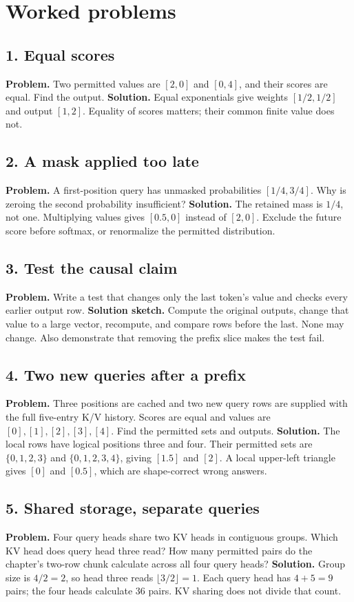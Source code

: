 \section{Worked problems}
\subsection*{1. Equal scores}
\textbf{Problem.} Two permitted values are $[2,0]$ and $[0,4]$, and their
scores are equal. Find the output.
\textbf{Solution.} Equal exponentials give weights $[1/2,1/2]$ and output
$[1,2]$. Equality of scores matters; their common finite value does not.
\subsection*{2. A mask applied too late}
\textbf{Problem.} A first-position query has unmasked probabilities
$[1/4,3/4]$. Why is zeroing the second probability insufficient?
\textbf{Solution.} The retained mass is $1/4$, not one. Multiplying values
gives $[0.5,0]$ instead of $[2,0]$. Exclude the future score before softmax,
or renormalize the permitted distribution.
\subsection*{3. Test the causal claim}
\textbf{Problem.} Write a test that changes only the last token's value
and checks every earlier output row.
\textbf{Solution sketch.} Compute the original outputs, change that value
to a large vector, recompute, and compare rows before the last. None may
change. Also demonstrate that removing the prefix slice makes the test fail.
\subsection*{4. Two new queries after a prefix}
\textbf{Problem.} Three positions are cached and two new query rows are
supplied with the full five-entry K/V history. Scores are equal and values
are $[0],[1],[2],[3],[4]$. Find the permitted sets and outputs.
\textbf{Solution.} The local rows have logical positions three and four.
Their permitted sets are $\{0,1,2,3\}$ and $\{0,1,2,3,4\}$, giving
$[1.5]$ and $[2]$. A local upper-left triangle gives $[0]$ and $[0.5]$,
which are shape-correct wrong answers.
\subsection*{5. Shared storage, separate queries}
\textbf{Problem.} Four query heads share two KV heads in contiguous groups.
Which KV head does query head three read? How many permitted pairs do the
chapter's two-row chunk calculate across all four query heads?
\textbf{Solution.} Group size is $4/2=2$, so head three reads
$\lfloor3/2\rfloor=1$. Each query head has $4+5=9$ pairs;
the four heads calculate 36 pairs. KV sharing does not divide that count.
